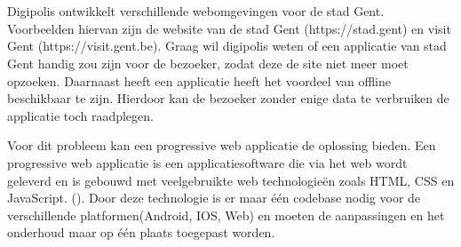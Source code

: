 
\chapter{}
\label{ch:inleiding}



\section{}
\label{sec:probleemstelling}

Digipolis ontwikkelt verschillende webomgevingen voor de stad Gent. Voorbeelden hiervan zijn de website van de stad Gent (https://stad.gent) en visit Gent (https://visit.gent.be). Graag wil digipolis weten of een applicatie van stad Gent handig zou zijn voor de bezoeker, zodat deze de site niet meer moet opzoeken. Daarnaast heeft een applicatie heeft het voordeel van offline beschikbaar te zijn. Hierdoor kan de bezoeker zonder enige data te verbruiken de applicatie toch raadplegen.

Voor dit probleem kan een progressive web applicatie de oplossing bieden. Een progressive web applicatie is een applicatiesoftware die via het web wordt geleverd en is gebouwd met veelgebruikte web technologieën zoals HTML, CSS en JavaScript. (\cite{DEFINITION_PWA}). Door deze technologie is er maar één codebase nodig voor de verschillende platformen(Android, IOS, Web) en moeten de aanpassingen en het onderhoud maar op één plaats toegepast worden.

